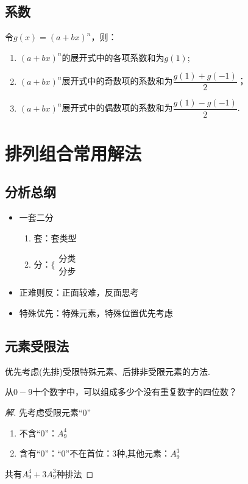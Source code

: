 \documentclass{BHCexam}
\begin{document}
\subsection{系数}
令$ g(x)=(a+bx)^n $，则：
\begin{enumerate}[1)]
\item $(a+bx)^n$的展开式中的各项系数和为$ g(1) $;
\item $(a+bx)^n$展开式中的奇数项的系数和为$ \dfrac{g(1)+g(-1)}{2} $；
\item $(a+bx)^n$展开式中的偶数项的系数和为$ \dfrac{g(1)-g(-1)}{2} $.
\end{enumerate}
\newpage 
\section{排列组合常用解法}
\subsection{分析总纲}
\begin{itemize}
\item 一套二分
\begin{enumerate}[(1)]
\item 套：套类型
\item 分：$\Bigg\{\begin{aligned}
\text{分类}\\\text{分步}
\end{aligned}$
\end{enumerate}
\item 正难则反：正面较难，反面思考
\item 特殊优先：特殊元素，特殊位置优先考虑
\end{itemize}
\subsection{元素受限法}
 优先考虑(先排)受限特殊元素、后排非受限元素的方法.\par
\begin{example}
从$0-9$十个数字中，可以组成多少个没有重复数字的四位数？
\begin{proof}[解]
先考虑受限元素“$0$”\begin{enumerate}[1)]
\item 不含“0”：$A_9^4$
\item 含有“0”：“0”不在首位：3种,其他元素：$A_9^3$
\end{enumerate}
共有$ A_9^4+3A_9^3 $种排法
\end{proof}
\end{example}
\end{document}
